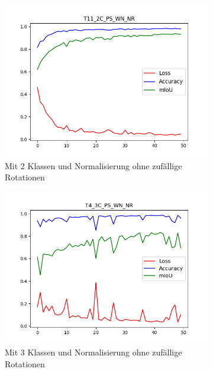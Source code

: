 \documentclass[12pt,titlepage, twoside]{article}
\begin{document}
\begin{figure}
    \centering 
\begin{subfigure}{0.485\textwidth}
  \includegraphics[width=\linewidth]{./Images/T11_2C_PS_WN_NR.png}
  \caption{Mit 2 Klassen und Normalisierung ohne zufällige Rotationen}
  \label{fig:T11_2C_PS_WN_NR}
\end{subfigure}\hfil
\begin{subfigure}{0.485\textwidth}
  \includegraphics[width=\linewidth]{./Images/T4_3C_PS_WN_NR.png}
  \caption{Mit 3 Klassen und Normalisierung ohne zufällige Rotationen}
  \label{fig:T4_3C_PS_WN_NR}
\end{subfigure}
\medskip
\begin{subfigure}{0.485\textwidth}

\end{subfigure}
\end{figure}
\end{document}

